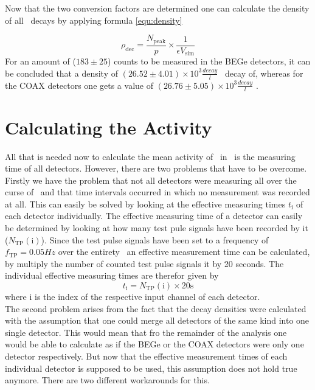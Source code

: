 \documentclass[encoding=utf8,british]{tumphthesis}
\begin{document}
Now that the two conversion factors are determined one can calculate the density of all \Kr\ decays by applying formula \ref{equ:density}

\begin{equation}
\rho_{\mathrm{dec}} = \frac{N_{\mathrm{peak}}}{p}\times\frac{1}{\epsilon V_{\mathrm{sim}}}
\label{equ:density}
\end{equation}For an amount of ($183\pm25$) counts to be measured in the BEGe detectors, it can be concluded that a density of $(26.52\pm4.01)\times10^3 \frac{\unit{decay}}{\unit{l}}$ \Kr\ decay of, whereas for the COAX detectors one gets a value of $(26.76\pm5.05)\times10^3 \frac{\unit{decay}}{\unit{l}}$ . 
\\



\section{Calculating the Activity}
\label{sec:CalcActiv}

All that is needed now to calculate the mean activity of \Kr\ in \PII\ is the measuring time of all detectors.
However, there are two problems that have to be overcome.
Firstly we have the problem that not all detectors were measuring all over the curse of \PII\ and that time intervals occurred in which no measurement was recorded at all.
This can easily be solved by looking at the effective measuring times $t_\mathrm{i}$ of each detector individually.
The effective measuring time of a detector can easily be determined by looking at how many test pule signals have been recorded by it ($N_{\mathrm{TP}}(\mathrm{i})$). 
Since the test pulse signals have been set to a frequency of $f_\mathrm{TP} = 0.05\unit{Hz} $ over the entirety \PII\, an effective measurement time can be calculated, by multiply the number of counted test pulse signals it by 20 seconds.
The individual effective measuring times are therefor given by
\begin{equation*}
    t_\mathrm{i} = N_{\mathrm{TP}}(\mathrm{i}) \times 20\mathrm{s}
\end{equation*}
where i is the index of the respective input channel of each detector.
\\

The second problem arises from the fact that the decay densities were  calculated with the assumption that one could merge all detectors of the same kind into one single detector.
This would mean that fro the remainder of the analysis one would be able to calculate as if the BEGe or the COAX detectors were only one detector respectively.
But now that the effective measurement times of each individual detector is supposed to be used, this assumption does not hold true anymore.
There are two different workarounds for this.
\\
\end{document}
